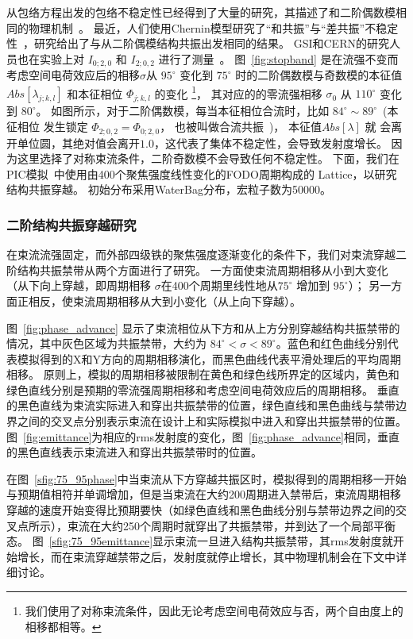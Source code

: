 从包络方程出发的包络不稳定性已经得到了大量的研究，其描述了和二阶偶数模相同的物理机制~\cite{11,12,18}。
最近，人们使用Chernin模型研究了“和共振”与“差共振”不稳定性~\cite{21,22}，研究给出了与从二阶偶模结构共振出发相同的结果。
GSI和CERN的研究人员也在实验上对 $I_{0;2,0}$ 和 $I_{2;0,2}$ 进行了测量~\cite{singh2014observations,cernAdrian}。
图~\ref{fig:stopband} 是在流强不变而考虑空间电荷效应后的相移$\sigma$从 $95^{\circ}$
变化到 $75^{\circ}$ 时的二阶偶数模与奇数模的本征值 $Abs[\lambda_{j;k,l}]$ 和本征相位 $\Phi_{j;k,l}$ 的变化
\footnote{我们使用了对称束流条件，因此无论考虑空间电荷效应与否，两个自由度上的相移都相等。}，
其对应的的零流强相移 $\sigma_0$ 从 $110^{\circ}$ 变化到 $80^{\circ}$。
如图所示，对于二阶偶数模，每当本征相位合流时，比如 $84^\circ \sim 89^\circ$~(本征相位
发生锁定 $\Phi_{2;0,2}=\Phi_{0;2,0}$， 也被叫做合流共振~\cite{12})， 本征值$Abs[\lambda]$ 就
会离开单位圆，其绝对值会离开$1.0$，这代表了集体不稳定性，会导致发射度增长。
因为这里选择了对称束流条件，二阶奇数模不会导致任何不稳定性。
下面，我们在PIC模拟~\cite{23,24}中使用由400个聚焦强度线性变化的FODO周期构成的 Lattice，以研究结构共振穿越。
初始分布采用WaterBag分布，宏粒子数为50000。


\subsubsection{二阶结构共振穿越研究}

在束流流强固定，而外部四级铁的聚焦强度逐渐变化的条件下，我们对束流穿越二阶结构共振禁带从两个方面进行了研究。
一方面使束流周期相移从小到大变化（从下向上穿越，即周期相移 $\sigma$在400个周期里线性地从$75^{\circ}$ 增加到 $95^{\circ}$）；
另一方面正相反，使束流周期相移从大到小变化（从上向下穿越）。

图~\ref{fig:phase_advance} 显示了束流相位从下方和从上方分别穿越结构共振禁带的情况，其中灰色区域为共振禁带，大约为 $84^ {\circ}<\sigma<89^{\circ}$。蓝色和红色曲线分别代表模拟得到的X和Y方向的周期相移演化，而黑色曲线代表平滑处理后的平均周期相移。
原则上，模拟的周期相移被限制在黄色和绿色线所界定的区域内，黄色和绿色直线分别是预期的零流强周期相移和考虑空间电荷效应后的周期相移。 
垂直的黑色直线为束流实际进入和穿出共振禁带的位置，绿色直线和黑色曲线与禁带边界之间的交叉点分别表示束流在设计上和实际模拟中进入和穿出共振禁带的位置。
图~\ref{fig:emittance}为相应的rms发射度的变化，图~\ref{fig:phase_advance}相同，垂直的黑色直线表示束流进入和穿出共振禁带时的位置。

在图~\ref{sfig:75_95phase}中当束流从下方穿越共振区时，模拟得到的周期相移一开始与预期值相符并单调增加，但是当束流在大约200周期进入禁带后，束流周期相移穿越的速度开始变得比预期要快（如绿色直线和黑色曲线分别与禁带边界之间的交叉点所示），束流在大约250个周期时就穿出了共振禁带，并到达了一个局部平衡态。
图~\ref{sfig:75_95emittance}显示束流一旦进入结构共振禁带，其rms发射度就开始增长，而在束流穿越禁带之后，发射度就停止增长，其中物理机制会在下文中详细讨论。

